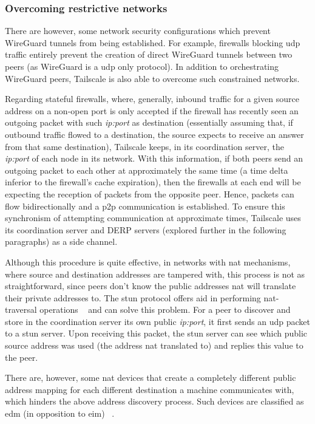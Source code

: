 \documentclass[11pt,twoside,a4paper]{report}
\begin{document}
\subsubsection{Overcoming restrictive networks}
\label{ssec:tsnetworks}

There are however, some network security configurations which prevent WireGuard tunnels from being established. For example, firewalls blocking \ac{udp} traffic entirely prevent the creation of direct WireGuard tunnels between two peers (as WireGuard is a \ac{udp} only protocol). In addition to orchestrating WireGuard peers, Tailscale is also able to overcome such constrained networks.

Regarding stateful firewalls, where, generally, inbound traffic for a given source address on a non-open port is only accepted if the firewall has recently seen an outgoing packet with such \emph{ip:port} as destination (essentially assuming that, if outbound traffic flowed to a destination, the source expects to receive an answer from that same destination), Tailscale keeps, in its coordination server, the \emph{ip:port} of each node in its network. With this information, if both peers send an outgoing packet to each other at approximately the same time (a time delta inferior to the firewall's cache expiration), then the firewalls at each end will be expecting the reception of packets from the opposite peer. Hence, packets can flow bidirectionally and a \ac{p2p} communication is established. To ensure this synchronism of attempting communication at approximate times, Tailscale uses its coordination server and \ac{DERP} servers (explored further in the following paragraphs) as a side channel.

Although this procedure is quite effective, in networks with \ac{nat} mechanisms, where source and destination addresses are tampered with, this process is not as straightforward, since peers don't know the public addresses \ac{nat} will translate their private addresses to. The \ac{stun} protocol offers aid in performing \ac{nat}-traversal operations ~\cite{rfc8489} and can solve this problem. For a peer to discover and store in the coordination server its own public \emph{ip:port}, it first sends an \ac{udp} packet to a \ac{stun} server. Upon receiving this packet, the \ac{stun} server can see which public source address was used (the address \ac{nat} translated to) and replies this value to the peer.

There are, however, some \ac{nat} devices that create a completely different public address mapping for each different destination a machine communicates with, which hinders the above address discovery process. Such devices are classified as \ac{edm} (in opposition to \ac{eim}) ~\cite{rfc4787}.
\end{document}
